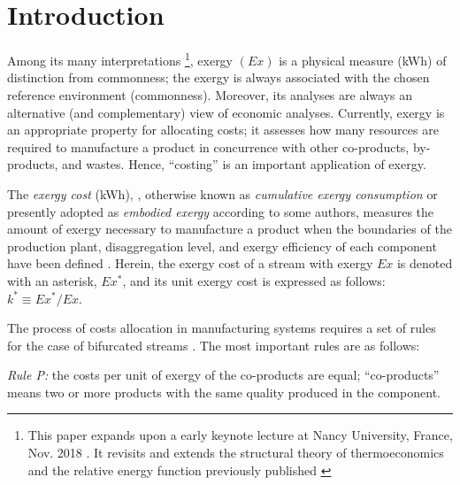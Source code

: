 \documentclass[energies,article,submit,moreauthors,pdftex]{Definitions/mdpi}
\begin{document}
\section{Introduction}
Among its many interpretations \footnote{This paper expands upon a early keynote lecture at Nancy University, France, Nov. 2018 \cite{Nancy2018}. It revisits and extends the structural theory of thermoeconomics and the relative energy function previously published \cite{Valero1992a,Valero1992b}}, exergy $(Ex)$ is a physical measure (kWh) of distinction from commonness; the exergy is always associated with the chosen reference environment (commonness). Moreover, its analyses are always an alternative (and complementary) view of economic analyses. Currently, exergy is an appropriate property for allocating costs; it assesses how many resources are required to manufacture a product in concurrence with other co-products, by-products, and wastes. Hence, “costing” is an important application of exergy.

The \emph{exergy cost} (kWh), \cite{Valero1986a}, otherwise known as \emph{cumulative exergy consumption} \cite{Morris1986,Szargut1988} or presently adopted as \emph{embodied exergy} according to some authors, measures the amount of exergy necessary to manufacture a product when the boundaries of the production plant, disaggregation level, and exergy efficiency of each component have been defined \cite{Valero1986a,Lozano1993}. Herein, the exergy cost of a stream with exergy $Ex$ is denoted with an asterisk, $Ex^*$, and its unit exergy cost is expressed as follows: $k^*\equiv Ex^*/Ex$.

The process of costs allocation in manufacturing systems requires a set of rules for the case of bifurcated streams \cite{Lozano1993,Tsatsaronis2007}. The most important rules are as follows: 

\emph{Rule P:} the costs per unit of exergy of the co-products are equal; “co-products” means two or more products with the same quality produced in the component. 
\end{document}
